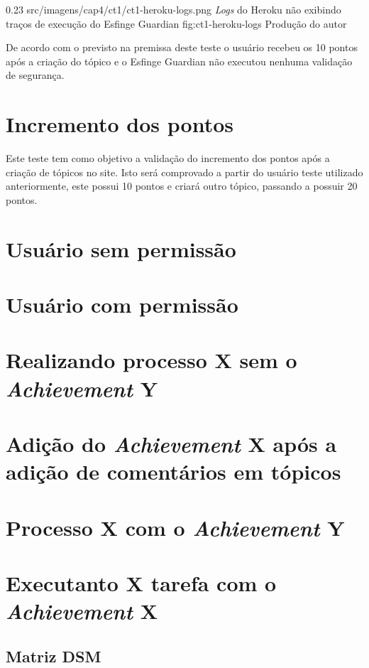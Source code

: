 \begin{image}
{0.23}
{src/imagens/cap4/ct1/ct1-heroku-logs.png}
{\textit{Logs} do Heroku não exibindo traços de execução do Esfinge Guardian}
{fig:ct1-heroku-logs}
{Produção do autor}
\end{image}

\par De acordo com o previsto na premissa deste teste o usuário recebeu os 10 pontos após a criação do tópico e o Esfinge Guardian não executou nenhuma validação de segurança.

\section{Incremento dos pontos}

\par Este teste tem como objetivo a validação do incremento dos pontos após a criação de tópicos no site. Isto será comprovado a partir do usuário teste utilizado anteriormente, este possui 10 pontos e criará outro tópico, passando a possuir 20 pontos.



\section{Usuário sem permissão}

\section{Usuário com permissão}

\section{Realizando processo X sem o \textit{Achievement} Y}

\section{Adição do \textit{Achievement} X após a adição de comentários em tópicos}

\section{Processo X com o \textit{Achievement} Y}

\section{Executanto X tarefa com o \textit{Achievement} X}

\subsection{Matriz DSM}